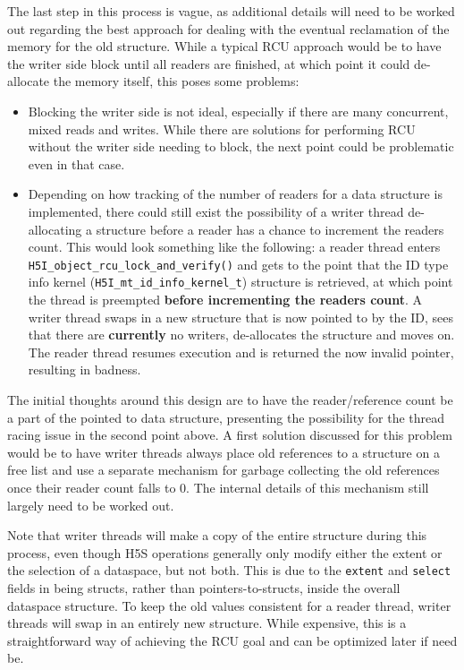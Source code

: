 \documentclass[../HDF5_RFC.tex]{subfiles}
\begin{document}
The last step in this process is vague, as additional details will need to be worked out regarding the
best approach for dealing with the eventual reclamation of the memory for the old structure. While a
typical RCU approach would be to have the writer side block until all readers are finished, at which
point it could de-allocate the memory itself, this poses some problems:

\begin{itemize}
    \item Blocking the writer side is not ideal, especially if there are many concurrent, mixed reads and
          writes. While there are solutions for performing RCU without the writer side needing to block,
          the next point could be problematic even in that case.
    \item Depending on how tracking of the number of readers for a data structure is implemented, there
          could still exist the possibility of a writer thread de-allocating a structure before a reader
          has a chance to increment the readers count. This would look something like the following: a
          reader thread enters \texttt{H5I\_object\_rcu\_lock\_and\_verify()} and gets to the point that
          the ID type info kernel (\texttt{H5I\_mt\_id\_info\_kernel\_t}) structure is retrieved, at which
          point the thread is preempted \textbf{before incrementing the readers count}. A writer thread
          swaps in a new structure that is now pointed to by the ID, sees that there are \textbf{currently}
          no writers, de-allocates the structure and moves on. The reader thread resumes execution and is
          returned the now invalid pointer, resulting in badness.
\end{itemize}

The initial thoughts around this design are to have the reader/reference count be a part of the pointed to
data structure, presenting the possibility for the thread racing issue in the second point above. A first
solution discussed for this problem would be to have writer threads always place old references to a
structure on a free list and use a separate mechanism for garbage collecting the old references once their
reader count falls to 0. The internal details of this mechanism still largely need to be worked out.

Note that writer threads will make a copy of the entire  structure during
this process, even though H5S operations generally only modify either the extent or the selection of a
dataspace, but not both. This is due to the \texttt{extent} and \texttt{select} fields in
 being structs, rather than pointers-to-structs, inside the overall
dataspace structure. To keep the old values consistent for a reader thread, writer threads will swap in
an entirely new structure. While expensive, this is a straightforward way of achieving the RCU goal and
can be optimized later if need be.
\end{document}
